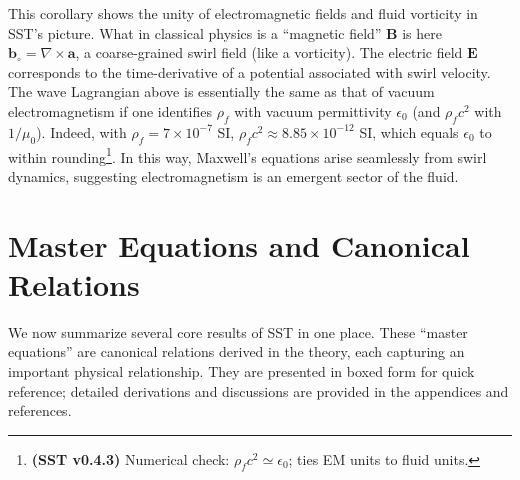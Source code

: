 \documentclass[reprint,aps,onecolumn,nofootinbib]{revtex4-2}
\begin{document}
    \noindent This corollary shows the unity of electromagnetic fields and fluid vorticity in SST’s picture. What in classical physics is a “magnetic field” $\mathbf{B}$ is here $\mathbf{b}_{\circ} = \nabla\times \mathbf{a}$, a coarse-grained swirl field (like a vorticity). The electric field $\mathbf{E}$ corresponds to the time-derivative of a potential associated with swirl velocity. The wave Lagrangian above is essentially the same as that of vacuum electromagnetism if one identifies $\rho_f$ with vacuum permittivity $\epsilon_0$ (and $\rho_f c^2$ with $1/\mu_0$). Indeed, with $\rho_f = 7\times10^{-7}$ SI, $\rho_f c^2 \approx 8.85\times10^{-12}$ SI, which equals $\epsilon_0$ to within rounding\footnote{\textbf{(SST v0.4.3)} Numerical check: $\rho_f c^2\simeq \epsilon_0$; ties EM units to fluid units.}. In this way, Maxwell’s equations arise seamlessly from swirl dynamics, suggesting electromagnetism is an emergent sector of the fluid.


\section{Master Equations and Canonical Relations}
    We now summarize several core results of SST in one place. These “master equations” are canonical relations derived in the theory, each capturing an important physical relationship. They are presented in boxed form for quick reference; detailed derivations and discussions are provided in the appendices and references.
\end{document}
